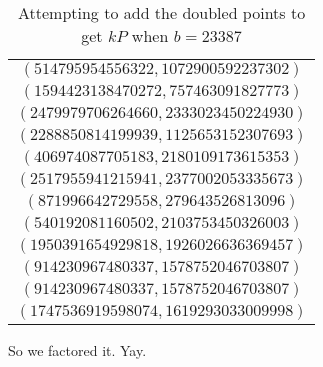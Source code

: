 \begin{table}[htbp]
	\centering
	\begin{tabular}{c}
		$(514795954556322, 1072900592237302)$\\
		$(1594423138470272, 757463091827773)$\\
		$(2479979706264660, 2333023450224930)$\\
		$(2288850814199939, 1125653152307693)$\\
		$(406974087705183, 2180109173615353)$\\
		$(2517955941215941, 2377002053335673)$\\
		$(871996642729558, 279643526813096)$\\
		$(540192081160502, 2103753450326003)$\\
		$(1950391654929818, 1926026636369457)$\\
		$(914230967480337, 1578752046703807)$\\
		$(914230967480337, 1578752046703807)$\\
		$(1747536919598074, 1619293033009998)$
	\end{tabular}
	\caption{Attempting to add the doubled points to get $kP$ when $b=23387$}
	\label{successfuladd}
\end{table}
So we factored it. Yay.
